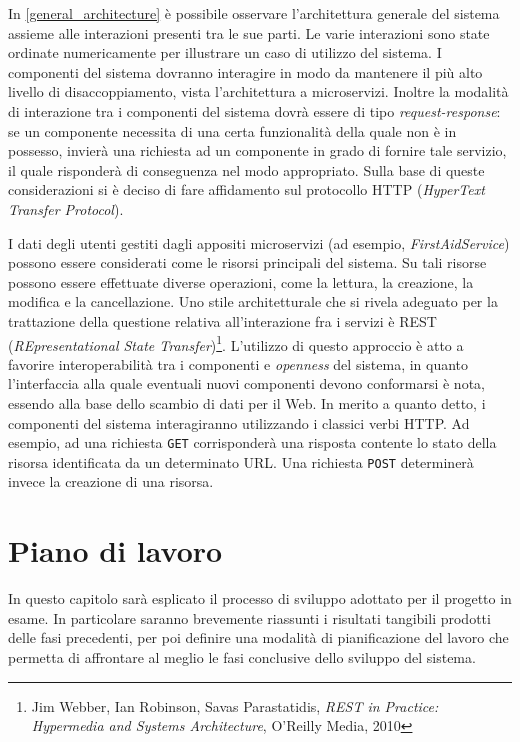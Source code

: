 \documentclass[a4paper,12pt]{report}
\begin{document}
In \autoref{general_architecture} è possibile osservare l'architettura generale del sistema assieme alle interazioni presenti tra le sue parti. Le varie interazioni sono state ordinate numericamente per illustrare un caso di utilizzo del sistema. I componenti del sistema dovranno interagire in modo da mantenere il più alto livello di disaccoppiamento, vista l'architettura a microservizi. Inoltre la modalità di interazione tra i componenti del sistema dovrà essere di tipo \emph{request-response}: se un componente necessita di una certa funzionalità della quale non è in possesso, invierà una richiesta ad un componente in grado di fornire tale servizio, il quale risponderà di conseguenza nel modo appropriato. Sulla base di queste considerazioni si è deciso di fare affidamento sul protocollo HTTP (\emph{HyperText Transfer Protocol}).

I dati degli utenti gestiti dagli appositi microservizi (ad esempio, \emph{FirstAidService}) possono essere considerati come le risorsi principali del sistema. Su tali risorse possono essere effettuate diverse operazioni, come la lettura, la creazione, la modifica e la cancellazione. Uno stile architetturale che si rivela adeguato per la trattazione della questione relativa all'interazione fra i servizi è REST (\emph{REpresentational State Transfer})\footnote{Jim Webber, Ian Robinson, Savas Parastatidis, {\em REST in Practice: Hypermedia and Systems Architecture}, O'Reilly Media, 2010}. L'utilizzo di questo approccio è atto a favorire interoperabilità tra i componenti e \emph{openness} del sistema, in quanto l'interfaccia alla quale eventuali nuovi componenti devono conformarsi è nota, essendo alla base dello scambio di dati per il Web.
In merito a quanto detto, i componenti del sistema interagiranno utilizzando i classici verbi HTTP. Ad esempio, ad una richiesta \texttt{GET} corrisponderà una risposta contente lo stato della risorsa identificata da un determinato URL. Una richiesta \texttt{POST} determinerà invece la creazione di una risorsa.

\chapter{Piano di lavoro}
In questo capitolo sarà esplicato il processo di sviluppo adottato per il progetto in esame. In particolare saranno brevemente riassunti i risultati tangibili prodotti delle fasi precedenti, per poi definire una modalità di pianificazione del lavoro che permetta di affrontare al meglio le fasi conclusive dello sviluppo del sistema.
\end{document}
